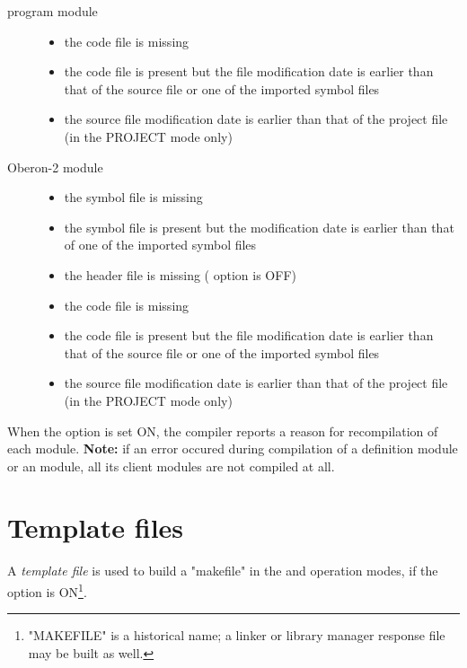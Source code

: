 \begin{description}
\item[\mt{} program module] \mbox{}

        \begin{itemize}
        \item the code file is missing
        \item the code file is present but
          the file modification date is earlier than that of the
          source file or one of the imported symbol files
\ifcomment
        \item the source file modification date is earlier than that
        of the project file (in the PROJECT mode only)
\fi
        \end{itemize}

\item[Oberon-2 module] \mbox{}

        \begin{itemize}
        \item the symbol file is missing
        \item the symbol file is present but
          the modification date is earlier than that
          of one of the imported symbol files
        \ifgenc
          \item the header file is missing ( option is OFF)
        \fi
        \item the code file is missing
        \item the code file is present but
          the file modification date is earlier than that of the
          source file or one of the imported symbol files
\ifcomment
        \item the source file modification date is earlier than that
        of the project file (in the PROJECT mode only)
\fi
        \end{itemize}
\end{description}

When the  option is set ON, the compiler reports a reason
for recompilation of each module.  {\bf Note:} if an error occured during
compilation of a \mt{} definition module or an \ot{} module,
all its client modules are not compiled at all.

\section{Template files}\label{xc:template}

A {\it template file} is used to build a "makefile"
in the 
and  operation modes,
if the option  is ON\footnote{
"MAKEFILE" is a historical name; a linker or library manager response file
may be built as well.}.

